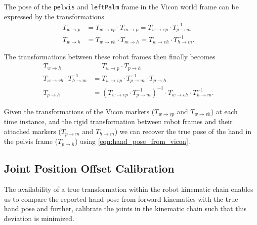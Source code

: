 The pose of the \texttt{pelvis} and \texttt{leftPalm} frame in the Vicon world frame can be expressed by the transformations
\begin{align}
T_{w \rightarrow p} &= T_{w \rightarrow vp} \cdot T_{m \rightarrow p} = T_{w \rightarrow vp} \cdot T_{p \rightarrow m}^{-1} \\
T_{w \rightarrow h} &= T_{w \rightarrow vh} \cdot T_{m \rightarrow h} = T_{w \rightarrow vh} \cdot T_{h \rightarrow m}^{-1} .
\end{align}

The transformations between these robot frames then finally becomes
\begin{align}
T_{w \rightarrow h} &= T_{w \rightarrow p} \cdot T_{p \rightarrow h} \\
T_{w \rightarrow vh} \cdot T_{h \rightarrow m}^{-1} &= T_{w \rightarrow vp} \cdot T_{p \rightarrow m}^{-1} \cdot T_{p \rightarrow h} \nonumber \\
T_{p \rightarrow h} &= \left( T_{w \rightarrow vp} \cdot T_{p \rightarrow m}^{-1} \right)^{-1} \cdot T_{w \rightarrow vh} \cdot T_{h \rightarrow m}^{-1} \label{eqn:hand_pose_from_vicon} .
\end{align}

Given the transformations of the Vicon markers ($T_{w \rightarrow vp}$ and $T_{w \rightarrow vh}$) at each time instance, and the rigid transformation between robot frames and their attached markers ($T_{p \rightarrow m}$ and $T_{h \rightarrow m}$) we can recover the true pose of the hand in the pelvis frame ($T_{p \rightarrow h}$) using \cref{eqn:hand_pose_from_vicon}.


\subsection{Joint Position Offset Calibration}

The availability of a true transformation within the robot kinematic chain enables us to compare the reported hand pose from forward kinematics with the true hand pose and further, calibrate the joints in the kinematic chain such that this deviation is minimized.

